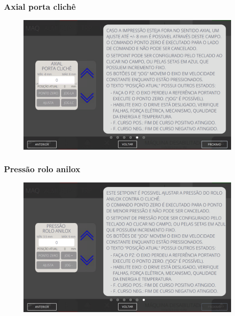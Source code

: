 \newpage
\thispagestyle{fancy}
\vspace*{\fill}
\subsubsection{\small{Axial porta clichê}} \label{sec:telaConfiguracoesImpressoraAxialPortaCliche}
\vspace*{\fill}
\begin{figure}[h]
    \centering
    \includegraphics[width=576 px,height=360 px]{src/imagesICV/04-printters/02-printter/settings/e-5.png}
\end{figure}
\vspace*{\fill}

\newpage
\thispagestyle{fancy}
\vspace*{\fill}
\subsubsection{\small{Pressão rolo anilox}} \label{sec:telaConfiguracoesImpressoraPressaoRoloAnilox}
\vspace*{\fill}
\begin{figure}[h]
    \centering
    \includegraphics[width=576 px,height=360 px]{src/imagesICV/04-printters/02-printter/settings/e-6.png}
\end{figure}
\vspace*{\fill}
